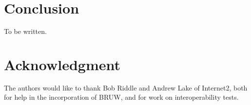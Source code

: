 \documentclass[conference]{IEEEtran}
\begin{document}
%


\section{Conclusion}
To be written.


\section*{Acknowledgment}
The authors would like to thank Bob Riddle and Andrew Lake of Internet2, both
for help in the incorporation of BRUW, and for work on interoperability tests.



%
%
%
\end{document}

